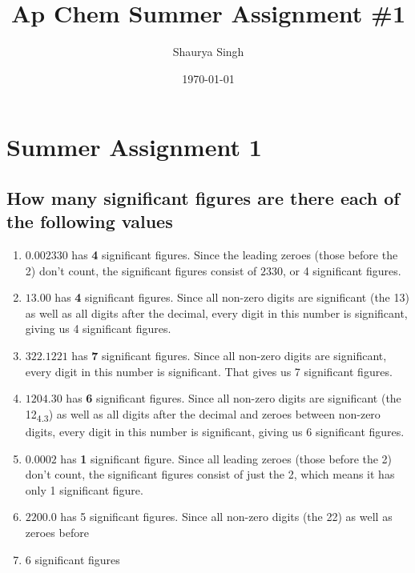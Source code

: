 \documentclass[11pt]{article}
\author{Shaurya Singh}
\date{\today}
\title{Ap Chem Summer Assignment \#1}
\begin{document}
\maketitle

\section{Summer Assignment 1}
\label{sec:orgca22e94}
\subsection{How many significant figures are there each of the following values}
\label{sec:org6d4fc6f}
\begin{enumerate}
\item \(0.002330\) has \textbf{4} significant figures. Since the leading zeroes (those before the 2) don't count, the significant figures consist of \(2330\), or 4 significant figures.
\item \(13.00\) has \textbf{4} significant figures. Since all non-zero digits are significant (the 13) as well as all digits after the decimal, every digit in this number is significant, giving us 4 significant figures.
\item \(322.1221\) has \textbf{7} significant figures. Since all non-zero digits are significant, every digit in this number is significant. That gives us 7 significant figures.
\item \(1204.30\) has \textbf{6} significant figures. Since all non-zero digits are significant (the 12\textsubscript{4.3}) as well as all digits after the decimal and zeroes between non-zero digits, every digit in this number is significant, giving us 6 significant figures.
\item \(0.0002\) has \textbf{1} significant figure. Since all leading zeroes (those before the 2) don't count, the significant figures consist of just the 2, which means it has only 1 significant figure.
\item \(2200.0\) has 5 significant figures. Since all non-zero digits (the 22) as well as zeroes before
\item 6 significant figures
\end{enumerate}
\end{document}
